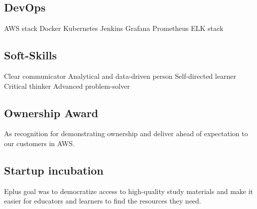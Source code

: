 \documentclass[a4paper]{my_cv}
\begin{document}
\begin{minipage}[t]{0.33\textwidth}
\subsection{DevOps}
AWS stack \textbullet{} Docker \textbullet{} Kubernetes \textbullet{} Jenkins \textbullet{} Grafana \textbullet{} Prometheus \textbullet{}  ELK stack
\sectionsep

\subsection{Soft-Skills}
Clear communicator \textbullet{} Analytical and data-driven person \textbullet{} Self-directed learner \textbullet{} Critical thinker \textbullet{}  Advanced problem-solver 
\sectionsep


\subsection{Ownership Award}
\vspace{\topsep} %
As recognition for demonstrating ownership and deliver ahead of expectation to our customers in AWS.
\sectionsep

\subsection{Startup incubation}
\vspace{\topsep} %
Eplus goal was to democratize access to high-quality study materials and make it easier for educators and learners to find the resources they need.
\sectionsep

\end{minipage} 
\hfill
\end{document}
